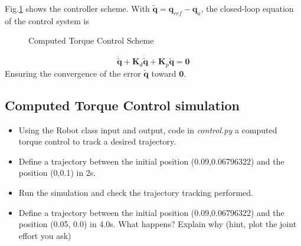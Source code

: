 \documentclass[a4paper]{article}
\newcommand{\mb}[1]{\mathbf{#1}}
\newcommand{\derivt}[1]{\frac{\mathrm{d}#1}{\mathrm{dt}}}
\begin{document}
	Fig.\ref{fig:CTC} shows the controller scheme. 	With $\mathbf{\tilde{\mb{q}}}=\mathbf{q}_{ref}-\mathbf{q}_a$, the closed-loop equation of the control system is 
	\begin{figure}
		\centering
		\caption{Computed Torque Control Scheme}
		\label{fig:CTC}
	\end{figure}

	\begin{equation*}
	\ddot{\tilde{\mb{q}}}+\mathbf{K}_d\dot{\tilde{\mb{q}}}+\mathbf{K}_p\tilde{\mb{q}}=\mb{0}
	\end{equation*}
	Ensuring the convergence of the error $\tilde{\mb{q}}$ toward $\mathbf{0}$. 
%
\subsection{Computed Torque Control simulation}
\begin{itemize}
    \item Using the Robot class input and output, code in \textit{control.py} a computed torque control to track a desired trajectory.
    \item Define a trajectory between the initial position (0.09,0.06796322) and the position (0,0.1) in 2s.
    \item Run the simulation and check the trajectory tracking performed.
    \item Define a trajectory between the initial position (0.09,0.06796322) and the position (0.05, 0.0) in 4.0s. What happens? Explain why (hint, plot the joint effort you ask)
\end{itemize}
%
\end{document}
